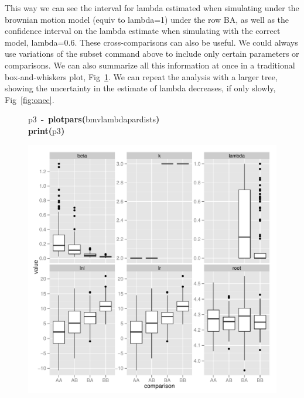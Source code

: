 \documentclass{elsarticle}
\makeatletter
\newcommand{\hlfunctioncall}[1]{\textcolor[rgb]{.5,0,.33}{\textbf{#1}}}%
\newcommand{\hlkeyword}[1]{\textbf{#1}}%
\newcommand{\hlassignement}[1]{\textbf{#1}}%
\newcommand{\hlsymbol}[1]{#1}%
\newcommand{\hlstd}[1]{\textcolor[rgb]{0,0,0}{#1}}%
\newenvironment{kframe}{%
 \def\FrameCommand##1{\hskip\@totalleftmargin \hskip-\fboxsep
 \colorbox{shadecolor}{##1}\hskip-\fboxsep
     \hskip-\linewidth \hskip-\@totalleftmargin \hskip\columnwidth}%
 \MakeFramed {\advance\hsize-\width
   \@totalleftmargin\z@ \linewidth\hsize
   \@setminipage}}%
 {\par\unskip\endMakeFramed}
\newenvironment{knitrout}{}{} %
\makeatother
\begin{document}
This way we can see the interval for lambda estimated when simulating under the brownian motion model (equiv to lambda=1) under the row BA, as well as the confidence interval on the lambda estimate when simulating with the correct model, lambda=0.6. These cross-comparisons can also be useful. We could always use variations of the subset command above to include only certain parameters or comparisons. We can also summarize all this information at once in a traditional box-and-whiskers plot, Fig~\ref{fig:pars}.  We can repeat the analysis with a larger tree, showing the uncertainty in the estimate of lambda decreases, if only slowly, Fig~\ref{fig:onec}.
\begin{figure}
\begin{center}
\begin{knitrout}
\color{fgcolor}\begin{kframe}
\begin{flushleft}
\ttfamily\noindent
\hlsymbol{p3}{\ }\hlassignement{\usebox{\hlnormalsizeboxlessthan}-}{\ }\hlfunctioncall{plot\usebox{\hlnormalsizeboxunderscore}pars}\hlkeyword{(}\hlsymbol{bm\usebox{\hlnormalsizeboxunderscore}v\usebox{\hlnormalsizeboxunderscore}lambda}\hlkeyword{\usebox{\hlnormalsizeboxdollar}}\hlsymbol{par\usebox{\hlnormalsizeboxunderscore}dists}\hlkeyword{)}\hspace*{\fill}\\
\hlstd{}\hlfunctioncall{print}\hlkeyword{(}\hlsymbol{p3}\hlkeyword{)}\mbox{}
\normalfont
\end{flushleft}


{\centering \includegraphics{allpars} 

}

\end{kframe}
\end{knitrout}

\end{center}
\label{fig:pars}
\end{figure}
\end{document}
